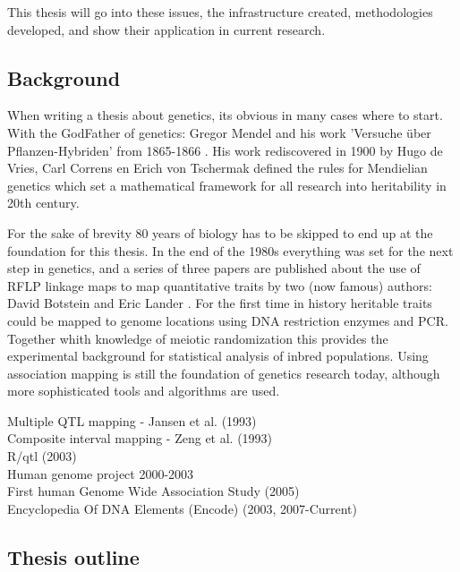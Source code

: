 This thesis will go into these issues, the infrastructure created, methodologies developed, and 
show their application in current research.

\subsection{Background}

When writing a thesis about genetics, its obvious in many cases where to start. With the 
GodFather of genetics: Gregor Mendel and his work 'Versuche \"uber Pflanzen-Hybriden' 
from 1865-1866 \cite{Mendel:1866}. His work rediscovered in 1900 by Hugo de Vries, Carl 
Correns en Erich von Tschermak defined the rules for Mendielian genetics \cite{deVries:1889} 
which set a mathematical framework for all research into heritability in 20th century.

For the sake of brevity 80 years of biology has to be skipped to end up at the foundation 
for this thesis. In the end of the 1980s everything was set for the next step in genetics, and 
a series of three papers are published about the use of RFLP linkage maps to map quantitative 
traits by two (now famous) authors: David Botstein and Eric Lander 
\cite{Lander:1986, Lander:1987, Lander:1989}. For the first time in history heritable traits 
could be mapped to genome locations using DNA restriction enzymes and PCR. Together whith knowledge 
of meiotic randomization this provides the experimental background for statistical analysis 
of inbred populations. Using association mapping is still the foundation of genetics research 
today, although more sophisticated tools and algorithms are used.

Multiple QTL mapping - Jansen et al. (1993)\\
Composite interval mapping -  Zeng et al. (1993)\\
R/qtl (2003)\\
Human genome project 2000-2003\\
First human Genome Wide Association Study (2005)\\
Encyclopedia Of DNA Elements (Encode) (2003, 2007-Current)


\subsection{Thesis outline}

